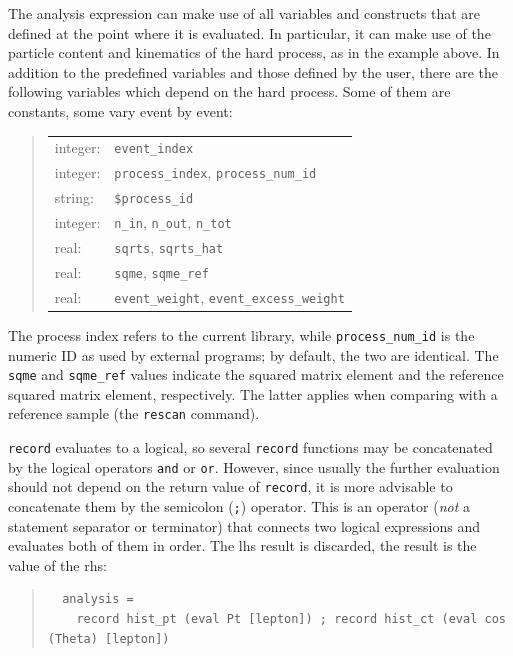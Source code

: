 \documentclass[12pt]{book}
\newcommand{\ttt}[1]{\texttt{#1}}
\begin{document}
The analysis expression can make use of all variables and constructs that are
defined at the point where it is evaluated.  In particular, it can make use of
the particle content and kinematics of the hard process, as in the example
above.  In addition to the predefined variables and those defined by the user,
there are the following variables which depend on the hard process.  Some of
them are constants, some vary event by event:
\begin{quote}
\begin{tabular}{ll}
integer: &\ttt{event\_index} \\
integer: &\ttt{process\_index}, \ttt{process\_num\_id} \\
string: &\ttt{\$process\_id} \\
integer: &\ttt{n\_in}, \ttt{n\_out}, \ttt{n\_tot} \\
real: &\ttt{sqrts}, \ttt{sqrts\_hat} \\
real: &\ttt{sqme}, \ttt{sqme\_ref} \\
real: &\ttt{event\_weight}, \ttt{event\_excess\_weight}
\end{tabular}
\end{quote}
The process index refers to the current library, while \ttt{process\_num\_id}
is the numeric ID as used by external programs; by default, the two are
identical.  The \ttt{sqme} and \ttt{sqme\_ref} values indicate the squared
matrix element and the reference squared matrix element, respectively.  The
latter applies when comparing with a reference sample (the \ttt{rescan}
command).

\ttt{record} evaluates to a logical, so several \ttt{record} functions may
be concatenated by the logical operators \ttt{and} or \ttt{or}.  However,
since usually the further evaluation should not depend on the return value of
\ttt{record}, it is more advisable to concatenate them by the semicolon
(\ttt{;}) operator.  This is an operator (\emph{not} a statement separator or
terminator) that connects two logical expressions and evaluates both of them
in order.  The lhs result is discarded, the result is the value of the rhs:
\begin{quote}
  \begin{footnotesize}
\begin{verbatim}
  analysis = 
    record hist_pt (eval Pt [lepton]) ; record hist_ct (eval cos (Theta) [lepton])
\end{verbatim}
  \end{footnotesize}
\end{quote}
\end{document}
